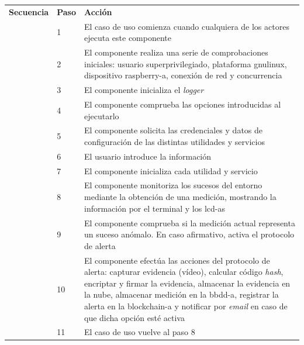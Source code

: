\documentclass[12pt,a4paper, twoside]{report}
\begin{document}
\begin{longtable}{|p{3cm}|p{1cm}|p{12.5cm}|}
		{\cellcolor{Gainsboro}\textbf{Secuencia}} & \textbf{Paso} & \textbf{Acción}  \\ \cline{2-3} 
		\cellcolor{Gainsboro} & 1 & El caso de uso comienza cuando cualquiera de los actores ejecuta este componente \\ \cline{2-3}  
		\cellcolor{Gainsboro} & 2 & El componente realiza una serie de comprobaciones iniciales: usuario superprivilegiado, plataforma \gls{gnulinux}, dispositivo \gls{raspberry-a}, conexión de red y concurrencia \\ \cline{2-3}  
		\cellcolor{Gainsboro} & 3 & El componente inicializa el \textit{logger} \\ \cline{2-3}  
		\cellcolor{Gainsboro} & 4 & El componente comprueba las opciones introducidas al ejecutarlo \\ \cline{2-3}  
		\cellcolor{Gainsboro} & 5 & El componente solicita las credenciales y datos de configuración de las distintas utilidades y servicios \\ \cline{2-3}  
		\cellcolor{Gainsboro} & 6 & El usuario introduce la información \\ \cline{2-3}  
		\cellcolor{Gainsboro} & 7 & El componente inicializa cada utilidad y servicio \\ \cline{2-3}  
		\cellcolor{Gainsboro} & 8 & El componente monitoriza los sucesos del entorno mediante la obtención de una medición, mostrando la información por el terminal y los \glspl{lcd-a} \\ \cline{2-3}  
		\cellcolor{Gainsboro} & 9 & El componente comprueba si la medición actual representa un suceso anómalo. En caso afirmativo, activa el protocolo de alerta \\ \cline{2-3}  
		\cellcolor{Gainsboro} & 10 & El componente efectúa las acciones del protocolo de alerta: capturar evidencia (vídeo), calcular código \textit{hash}, encriptar y firmar la evidencia, almacenar la evidencia en la nube, almacenar medición en la \gls{bbdd-a}, registrar la alerta en la \gls{blockchain-a} y notificar por \textit{email} en caso de que dicha opción esté activa \\ \cline{2-3}  	
		\cellcolor{Gainsboro} & 11 & El caso de uso vuelve al paso 8 \\ \hline
		

\end{longtable}
\end{document}
